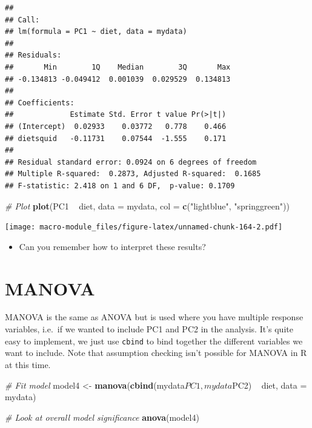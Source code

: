 \documentclass[]{book}
\newenvironment{Shaded}{\begin{snugshade}}{\end{snugshade}}
\newcommand{\KeywordTok}[1]{\textcolor[rgb]{0.13,0.29,0.53}{\textbf{{#1}}}}
\newcommand{\DataTypeTok}[1]{\textcolor[rgb]{0.13,0.29,0.53}{{#1}}}
\newcommand{\StringTok}[1]{\textcolor[rgb]{0.31,0.60,0.02}{{#1}}}
\newcommand{\CommentTok}[1]{\textcolor[rgb]{0.56,0.35,0.01}{\textit{{#1}}}}
\newcommand{\NormalTok}[1]{{#1}}
\providecommand{\tightlist}{%
  \setlength{\itemsep}{0pt}\setlength{\parskip}{0pt}}
\theoremstyle{definition}
\theoremstyle{definition}
\theoremstyle{definition}
\theoremstyle{remark}
\begin{document}
\begin{verbatim}
## 
## Call:
## lm(formula = PC1 ~ diet, data = mydata)
## 
## Residuals:
##       Min        1Q    Median        3Q       Max 
## -0.134813 -0.049412  0.001039  0.029529  0.134813 
## 
## Coefficients:
##             Estimate Std. Error t value Pr(>|t|)
## (Intercept)  0.02933    0.03772   0.778    0.466
## dietsquid   -0.11731    0.07544  -1.555    0.171
## 
## Residual standard error: 0.0924 on 6 degrees of freedom
## Multiple R-squared:  0.2873, Adjusted R-squared:  0.1685 
## F-statistic: 2.418 on 1 and 6 DF,  p-value: 0.1709
\end{verbatim}

\begin{Shaded}
\begin{Highlighting}[]
\CommentTok{# Plot}
\KeywordTok{plot}\NormalTok{(PC1 ~}\StringTok{ }\NormalTok{diet, }\DataTypeTok{data =} \NormalTok{mydata, }\DataTypeTok{col =} \KeywordTok{c}\NormalTok{(}\StringTok{"lightblue"}\NormalTok{, }\StringTok{"springgreen"}\NormalTok{))}
\end{Highlighting}
\end{Shaded}

\texttt{[image: macro-module\_files/figure-latex/unnamed-chunk-164-2.pdf]}

\begin{itemize}
\tightlist
\item
  Can you remember how to interpret these results?
\end{itemize}

\section{MANOVA}\label{manova}

MANOVA is the same as ANOVA but is used where you have multiple response
variables, i.e.~if we wanted to include PC1 and PC2 in the analysis.
It's quite easy to implement, we just use \texttt{cbind} to bind
together the different variables we want to include. Note that
assumption checking isn't possible for MANOVA in R at this time.

\begin{Shaded}
\begin{Highlighting}[]
\CommentTok{# Fit model}
\NormalTok{model4 <-}\StringTok{ }\KeywordTok{manova}\NormalTok{(}\KeywordTok{cbind}\NormalTok{(mydata$PC1,mydata$PC2) ~}\StringTok{ }\NormalTok{diet, }\DataTypeTok{data =} \NormalTok{mydata)}

\CommentTok{# Look at overall model significance}
\KeywordTok{anova}\NormalTok{(model4)}
\end{Highlighting}
\end{Shaded}
\end{document}
